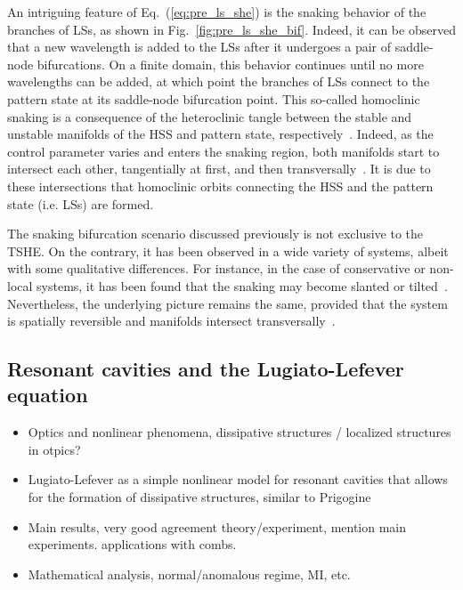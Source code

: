 An intriguing feature of Eq.~(\ref{eq:pre_ls_she}) is the snaking behavior of the branches of LSs, as shown
in Fig.~\ref{fig:pre_ls_she_bif}. Indeed, it can be observed that a new wavelength 
is added to the LSs after it undergoes a pair of saddle-node bifurcations. On a finite
domain, this behavior continues until no more wavelengths can be added, at which point the branches
of LSs connect to the pattern state at its saddle-node bifurcation point.
This so-called homoclinic snaking is a consequence of the heteroclinic tangle
between the stable and unstable manifolds of the HSS and pattern state, 
respectively~\cite{woods1999heteroclinic,coullet2000stable}. Indeed, as the
control parameter varies and enters the snaking region, both manifolds start
to intersect each other, tangentially at first, and then transversally~\cite{knobloch2015spatial}. 
It is due
to these intersections that homoclinic orbits connecting the HSS and the pattern state
(i.e. LSs) are formed.

The snaking bifurcation scenario discussed previously is not exclusive to the TSHE. 
On the contrary, it has been observed in a wide variety of systems, albeit with 
some qualitative differences. For instance, in the case of conservative or non-local systems,
it has been found that the snaking may become slanted or 
tilted~\cite{firth2007proposed,dawes2008localized,beaume2013convectons}. 
Nevertheless, the underlying picture remains the same,
provided that the system is spatially reversible and manifolds intersect 
transversally~\cite{knobloch2015spatial}.



\subsection{Resonant cavities and the Lugiato-Lefever equation}

\begin{itemize}
    \item Optics and nonlinear phenomena, dissipative structures / localized structures in otpics?
    \item Lugiato-Lefever as a simple nonlinear model for resonant cavities that allows for the
    formation of dissipative structures, similar to Prigogine
    \item Main results, very good agreement theory/experiment, mention main experiments.
    applications with combs.
    \item Mathematical analysis, normal/anomalous regime, MI, etc.
\end{itemize}

